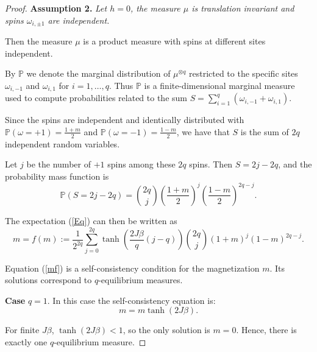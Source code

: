 \documentclass[11pt,reqno]{amsart}
\numberwithin{equation}{section} \setcounter{tocdepth}{1}
\begin{document}
\begin{proof}
{\bf Assumption 2.} {\it Let $h=0$, the measure $\mu$ is translation invariant and spins $\omega_{i,\pm 1}$ are independent.} 

Then the measure $ \mu $ is a product measure with spins at different sites independent. 

By $\mathbb{P}$ we denote  the marginal distribution of $\mu^{\otimes q}$ restricted to the specific sites $\omega_{i,-1}$ and $\omega_{i,1}$ for $i = 1, \dots, q$. Thus
$\mathbb{P}$ is a finite-dimensional marginal measure used to compute probabilities related to the sum  $ S = \sum_{i=1}^q (\omega_{i,-1} + \omega_{i,1}) $. 

Since the spins are independent and identically distributed with $ \mathbb{P}(\omega = +1) = \frac{1 + m}{2} $ and $ \mathbb{P}(\omega = -1) = \frac{1 - m}{2} $, we have that $ S $ is the sum of $ 2q $ independent random variables. 

Let $ j $ be the number of $ +1 $ spins among these $ 2q $ spins. Then $ S = 2j - 2q $, and the probability mass function is
$$
\mathbb{P}(S = 2j - 2q) = \binom{2q}{j} \left( \frac{1 + m}{2} \right)^j \left( \frac{1 - m}{2} \right)^{2q - j}.
$$

The expectation (\ref{Eq}) can then be written as
\begin{equation}\label{mf}
m = f(m):=\frac{1}{2^{2q}} \sum_{j=0}^{2q} \tanh\left( \frac{2 J\beta}{q} (j - q) \right) \binom{2q}{j} (1 + m)^j (1 - m)^{2q - j}.
\end{equation}

Equation (\ref{mf}) is a self-consistency condition for the magnetization $ m $. Its solutions correspond to $ q $-equilibrium measures.

{\bf  Case} $ q = 1 $. In this case 
the self-consistency equation is:
$$
m = m \tanh(2J\beta).
$$

For finite $ J\beta $, $ \tanh(2J\beta) < 1 $, so the only solution is $ m = 0 $. Hence, there is exactly one $ q $-equilibrium measure.


\end{proof}
\end{document}
